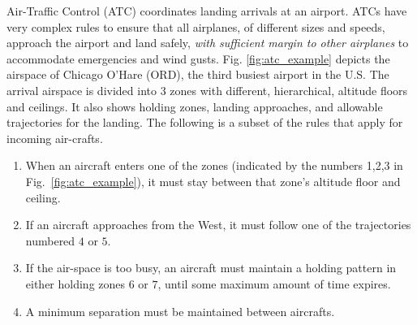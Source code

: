 \begin{exmp}
\label{ex:ATC_example}
Air-Traffic Control (ATC) coordinates landing arrivals at an airport. 
ATCs have very complex rules to ensure that all airplanes, of different sizes and speeds, approach the airport and land safely, \textit{with sufficient margin to other airplanes} to accommodate emergencies and wind gusts.
Fig. \ref{fig:atc_example} depicts the airspace of Chicago O'Hare (ORD), the third busiest airport in the U.S.
The arrival airspace is divided into 3 zones with different, hierarchical, altitude floors and ceilings. 
It also shows holding zones, landing approaches, and allowable trajectories for the landing. 
The following is a subset of the rules that apply for incoming air-crafts.

\begin{enumerate}
\vspace{-5pt}
\item When an aircraft enters one of the zones (indicated by the numbers 1,2,3 in Fig.~\ref{fig:atc_example}), it must stay between that zone's altitude floor and ceiling.%
\label{rule:floor ceiling}
\vspace{-5pt}
\item If an aircraft approaches from the West, it must follow one of the trajectories numbered $4$ or $5$. 
\label{rule:waypoints}
\vspace{-5pt}
\item If the air-space is too busy, an aircraft must maintain a holding pattern in either holding zones $6$ or $7$, until some maximum amount of time expires.
\label{rule:holding}
\vspace{-5pt}
\item A minimum separation must be maintained between aircrafts.
\vspace{-5pt}
\end{enumerate}
\end{exmp}

